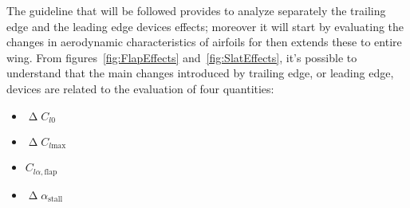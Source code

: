 \bigskip
\noindent
The guideline that will be followed provides to analyze separately the trailing edge and the leading edge devices effects; moreover it will start by evaluating the changes in aerodynamic characteristics of airfoils for then extends these to entire wing.
%
From figures~\ref{fig:FlapEffects} and~\ref{fig:SlatEffects}, it's possible to understand that the main changes introduced by trailing edge, or leading edge, devices are related to the evaluation of four quantities:
%
\begin{itemize}
\item $\upDelta C_{l0}$
\item $\upDelta C_{l\text{max}}$
\item $C_{l\alpha, \text{flap}}$
\item $\upDelta\alpha_{\text{stall}}$
\end{itemize}
%
